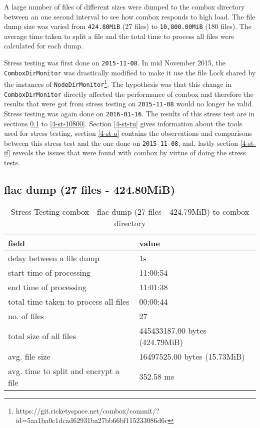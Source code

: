 A large number of files of different sizes were dumped to the combox
directory between an one second interval to see how combox responds to
high load. The file dump size was varied from \verb+424.80MiB+ (27
files) to \verb+10,800.00MiB+ (180 files). The average time taken to
split a file and the total time to process all files were calculated
for each dump.

Stress testing was first done on \verb+2015-11-08+. In mid November
2015, the \\ \verb+ComboxDirMonitor+ was drastically modified to make
it use the file Lock shared by the instances of
\verb+NodeDirMonitor+\footnote{https://git.ricketyspace.net/combox/commit/?id=5aa1ba0c1dcad62931ba27bb66bf115233086d6c}.
The hypothesis was that this change in \verb+ComboxDirMonitor+
directly affected the performance of combox and therefore the results
that were got from stress testing on \verb+2015-11-08+ would no longer
be valid. Stress testing was again done on \verb+2016-01-16+. The
results of this stress test are in sections \ref{4-st-424} to
\ref{4-st-10800}. Section \ref{4-st-tu} gives information about the
tools used for stress testing, section \ref{4-st-o} contains the
observations and comparisons between this stress test and the one done
on \verb+2015-11-08+, and, lastly section \ref{4-st-if} reveals the
issues that were found with combox by virtue of doing the stress
tests.

\subsection{flac dump (27 files - 424.80MiB)}\label{4-st-424}

\begin{center}
  \begin{table}[h]
    \begin{tabular}{ll}
      field & value\\
      \hline
      delay between a file dump & 1s\\
      start time of processing & 11:00:54\\
      end time of processing & 11:01:38\\
      total time taken to process all files & 00:00:44\\
      no. of files & 27\\
      total size of all files & 445433187.00 bytes (424.79MiB)\\
      avg. file size & 16497525.00 bytes (15.73MiB)\\
      avg. time to split and encrypt a file & 352.58 ms\\
    \end{tabular}
    \caption{Stress Testing combox - flac dump (27 files - 424.79MiB) to combox directory}
  \end{table}
\end{center}

